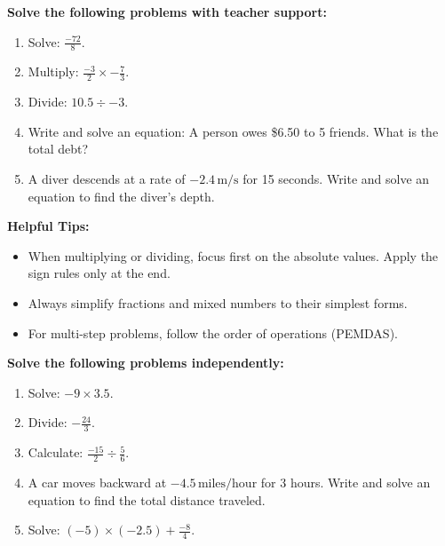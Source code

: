 \documentclass[12pt]{article}
\begin{document}
\begin{tcolorbox}[colframe=black!60, colback=white, 
coltitle=black, colbacktitle=black!15, fonttitle=\bfseries\Large, 
title=Guided Practice, halign title=center, left=10pt, right=10pt, top=10pt, bottom=15pt]
\textbf{Solve the following problems with teacher support:}
\begin{enumerate}[itemsep=5em]
    \item Solve: \( \frac{-72}{8} \).
    \item Multiply: \( \frac{-3}{2} \times -\frac{7}{3} \).
    \item Divide: \( 10.5 \div -3 \).
    \item Write and solve an equation: A person owes \$6.50 to 5 friends. What is the total debt?
    \item A diver descends at a rate of \( -2.4 \, \text{m/s} \) for 15 seconds. Write and solve an equation to find the diver’s depth.
\end{enumerate}
\end{tcolorbox}

\vspace{1em}

\begin{tcolorbox}[colframe=black!40, colback=gray!5, 
coltitle=black, colbacktitle=black!20, fonttitle=\bfseries\Large, 
title=Additional Notes, halign title=center, left=5pt, right=5pt, top=5pt, bottom=15pt]
\textbf{Helpful Tips:}
\begin{itemize}
    \item When multiplying or dividing, focus first on the absolute values. Apply the sign rules only at the end.
    \item Always simplify fractions and mixed numbers to their simplest forms.
    \item For multi-step problems, follow the order of operations (PEMDAS).
\end{itemize}
\end{tcolorbox}

\vspace{1em}

\begin{tcolorbox}[colframe=black!60, colback=white, 
coltitle=black, colbacktitle=black!15, fonttitle=\bfseries\Large, 
title=Independent Practice, halign title=center, left=10pt, right=10pt, top=10pt, bottom=15pt]
\textbf{Solve the following problems independently:}
\begin{enumerate}[itemsep=5em]
    \item Solve: \( -9 \times 3.5 \).
    \item Divide: \( -\frac{24}{3} \).
    \item Calculate: \( \frac{-15}{2} \div \frac{5}{6} \).
    \item A car moves backward at \( -4.5 \, \text{miles/hour} \) for 3 hours. Write and solve an equation to find the total distance traveled.
    \item Solve: \( (-5) \times (-2.5) + \frac{-8}{4} \).
\end{enumerate}
\end{tcolorbox}
\end{document}
